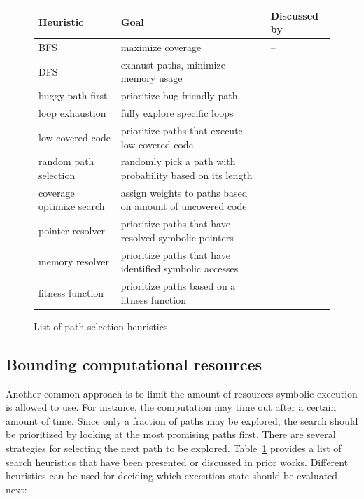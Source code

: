 \begin{figure}[t]
  \centering
  \begin{adjustbox}{width=1\columnwidth}
  \begin{small}
  \begin{tabular}{| l || l || l |}
    \hline      
    Heuristic & Goal & Discussed by \\ \hline\hline
    BFS & maximize coverage & -- \\
    DFS & exhaust paths, minimize memory usage & \cite{EXE-CCS06} \\
    buggy-path-first & prioritize bug-friendly path  & \cite{AEG-NDSS11} \\
    loop exhaustion & fully explore specific loops  & \cite{AEG-NDSS11} \\
    low-covered code & prioritize paths that execute low-covered code  & \cite{EXE-CCS06} \\
    random path selection & randomly pick a path with probability based on its length & \cite{KLEE-OSDI08} \\
    coverage optimize search & assign weights to paths based on amount of uncovered code & \cite{KLEE-OSDI08,MAYHEM-SP12} \\
    pointer resolver & prioritize paths that have resolved symbolic pointers & \cite{MAYHEM-SP12} \\
    memory resolver & prioritize paths that have identified symbolic accesses & \cite{MAYHEM-SP12} \\ 
    fitness function & prioritize paths based on a fitness function & \cite{CS-CACM13} \\
    \hline  
  \end{tabular}
  \end{small}
  \end{adjustbox}
  \caption{List of path selection heuristics.}
  \label{tab:heuristics}
\end{figure}


\subsection{Bounding computational resources}
\label{heuristics}

Another common approach is to limit the amount of resources symbolic execution is allowed to use. For instance, the computation may time out after a certain amount of time. Since only a fraction of paths may be explored, the search should be prioritized by looking at the most promising paths first. There are several strategies for selecting the next path to be explored.
Table~\ref{tab:heuristics} provides a list of search heuristics that have been presented or discussed in prior works. Different heuristics can be used for deciding which execution state should be evaluated next:

